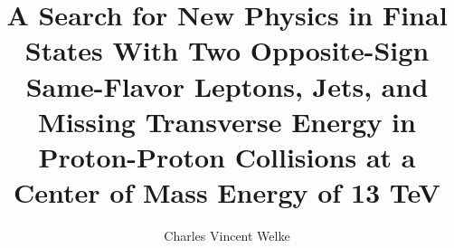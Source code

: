 \title{A Search for New Physics in Final States With Two Opposite-Sign Same-Flavor Leptons, Jets, and Missing Transverse Energy in Proton-Proton Collisions at a Center of Mass Energy of 13 TeV}

\author{Charles Vincent Welke}





